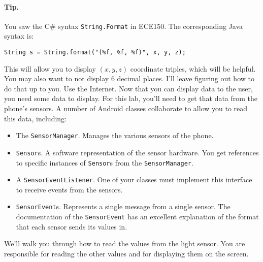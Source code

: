 \documentclass[10pt]{article}
\begin{document}
\paragraph{Tip.} You saw the C\# syntax {\tt String.Format} in ECE150. The corresponding Java syntax is:
\begin{verbatim}
String s = String.format("(%f, %f, %f)", x, y, z);
\end{verbatim}
This will allow you to display $(x, y, z)$ coordinate triples, which will be helpful. You may also want to not display 6 decimal places. I'll leave figuring out how to do that up to you. Use the Internet.
Now that you can display data to the user, you need some data to display. For this lab, you'll need to get that data from the phone's sensors. A number of Android classes collaborate to allow you to read this data, including:
\begin{itemize}
\item The {\tt SensorManager}. Manages the various sensors of the phone.
\item {\tt Sensor}s. A software representation of the sensor hardware. You get references to specific instances of {\tt Sensor}s from the {\tt SensorManager}.
\item A {\tt SensorEventListener}. One of your classes must implement this interface to receive events from the sensors.
\item {\tt SensorEvent}s. Represents a single message from a single sensor. The documentation of the {\tt SensorEvent} has an excellent explanation of the format that each sensor sends its values in.
\end{itemize}
We'll walk you through how to read the values from the light sensor. You are responsible
for reading the other values and for displaying them on the screen.
\end{document}
